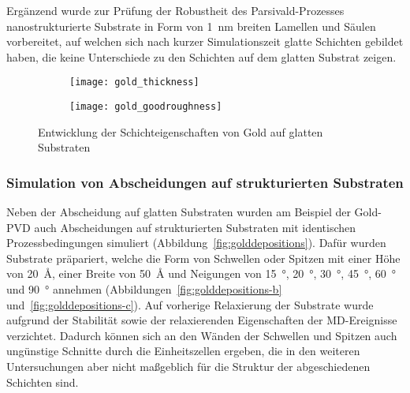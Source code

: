 Ergänzend wurde zur Prüfung der Robustheit des Parsivald-Prozesses nanostrukturierte Substrate in Form von \SI{1}{\nano\meter} breiten Lamellen und Säulen vorbereitet, auf welchen sich nach kurzer Simulationszeit glatte Schichten gebildet haben, die keine Unterschiede zu den Schichten auf dem glatten Substrat zeigen.

\begin{figure}[thp]
  \captionsetup[subfigure]{singlelinecheck=false}
  \def\subfigwidth{0.49\textwidth}

  \begin{subfigure}[t]{\subfigwidth}
    \texttt{[image: gold\_thickness]}
    \label{fig:goldsmooth-a}
  \end{subfigure}
  \hfill
  \begin{subfigure}[t]{\subfigwidth}
    \texttt{[image: gold\_goodroughness]}
    \label{fig:goldsmooth-b}
  \end{subfigure}

  \caption[Schichteigenschaften von Gold auf glatten Substraten]{
    Entwicklung der Schichteigenschaften von Gold auf glatten Substraten
  }
  \label{fig:goldsmooth}

\end{figure}

\subsubsection{Simulation von Abscheidungen auf strukturierten Substraten}

Neben der Abscheidung auf glatten Substraten wurden am Beispiel der Gold-PVD auch Abscheidungen auf strukturierten Substraten mit identischen Prozessbedingungen simuliert (Abbildung~\ref{fig:golddepositions}).
Dafür wurden Substrate präpariert, welche die Form von Schwellen oder Spitzen mit einer Höhe von \SI{20}{\angstrom}, einer Breite von \SI{50}{\angstrom} und Neigungen von \SI{15}{\degree}, \SI{20}{\degree}, \SI{30}{\degree}, \SI{45}{\degree}, \SI{60}{\degree} und \SI{90}{\degree} annehmen (Abbildungen~\ref{fig:golddepositions-b} und~\ref{fig:golddepositions-c}).
Auf vorherige Relaxierung der Substrate wurde aufgrund der Stabilität sowie der relaxierenden Eigenschaften der MD-Ereignisse verzichtet.
Dadurch können sich an den Wänden der Schwellen und Spitzen auch ungünstige Schnitte durch die Einheitszellen ergeben, die in den weiteren Untersuchungen aber nicht maßgeblich für die Struktur der abgeschiedenen Schichten sind.

